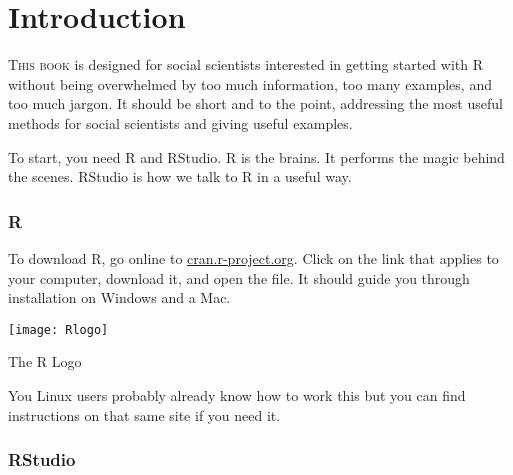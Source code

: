 \documentclass{book}
\begin{document}

\frontmatter


% 
% 
% 
% 
% 
% 



\newpage

\tableofcontents
\listoftables
\listoffigures

\mainmatter
\chapter*{Introduction}

\textsc{This book} is designed for social scientists interested in getting started with R without being overwhelmed by too much information, too many examples, and too much jargon. It should be short and to the point, addressing the most useful methods for social scientists and giving useful examples. 

To start, you need R and RStudio. R is the brains. It performs the magic behind the scenes. RStudio is how we talk to R in a useful way.

\subsection*{R}

To download R, go online to \href{https://cran.r-project.org/}{cran.r-project.org}. Click on the link that applies to your computer, download it, and open the file. It should guide you through installation on Windows and a Mac.
\begin{marginfigure}
  \texttt{[image: Rlogo]}
  \caption*{The R Logo}
  \label{fig_rlogo}
\end{marginfigure}
You Linux users probably already know how to work this but you can find instructions on that same site if you need it.


\subsection*{RStudio}
\end{document}
